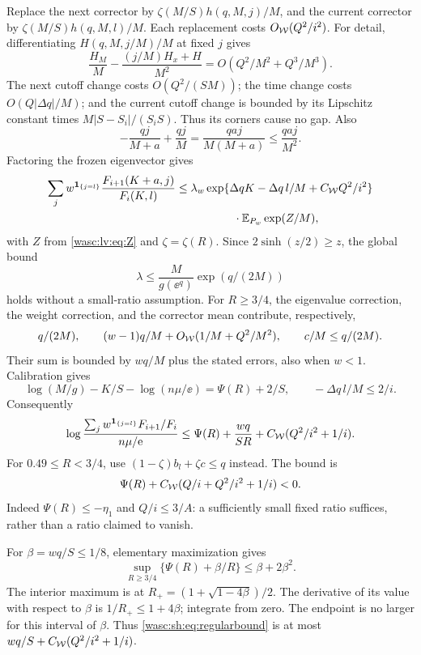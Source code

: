 \documentclass[11pt,a4paper]{article}
\theoremstyle{remark}\newtheorem{remark}[theorem]{Remark}
\newcommand{\ind}{\mathbf 1}\newcommand{\wasc}{\operatorname{wasc}}\newcommand{\dasc}{\operatorname{dasc}}
\numberwithin{equation}{section}
\begin{document}
Replace the next corrector by $\zeta(M/S)h(q,M,j)/M$, and the current corrector by $\zeta(M/S)h(q,M,l)/M$. Each replacement costs $O_{\mathcal W}(Q^2/i^2)$. For detail, differentiating $H(q,M,j/M)/M$ at fixed $j$ gives
\[
\frac{H_M}{M}-\frac{(j/M)H_x+H}{M^2}
=O(Q^2/M^2+Q^3/M^3).
\]
The next cutoff change costs $O(Q^2/(SM))$; the time change costs $O(Q|\Delta q|/M)$; and the current cutoff change is bounded by its Lipschitz constant times $M|S-S_i|/(S_iS)$. Thus its corners cause no gap. Also
\[
-\frac{qj}{M+a}+\frac{qj}{M}=\frac{qaj}{M(M+a)}\le\frac{qaj}{M^2}.
\]
Factoring the frozen eigenvector gives
\begin{align}\label{wasc:sh:eq:regulartransfer}
\sum_j w^{\ind_{\{j=l\}}}\frac{F_{i+1}(K+a,j)}{F_i(K,l)}
&\le\lambda_w\exp\{\Delta qK-\Delta q\,l/M+C_{\Wc}Q^2/i^2\}\notag\\
&\hspace{18mm}\cdot\E_{P_w}\exp(Z/M),
\end{align}
with $Z$ from \eqref{wasc:lv:eq:Z} and $\zeta=\zeta(R)$.
Since $2\sinh(z/2)\ge z$, the global bound
\begin{equation}\label{wasc:sh:eq:eigenupper}
\lambda\le\frac M{g(\ee^q)}\exp(q/(2M))
\end{equation}
holds without a small-ratio assumption. For $R\ge3/4$, the eigenvalue correction, the weight correction, and the corrector mean contribute, respectively,
\[
q/(2M),\qquad (w-1)q/M+O_{\mathcal W}(1/M+Q^2/M^2),\qquad c/M\le q/(2M).
\]
Their sum is bounded by $wq/M$ plus the stated errors, also when $w<1$. Calibration gives
\[
\log(M/g)-K/S-\log(n\mu/\ee)=\Psi(R)+2/S,
\qquad-\Delta q\,l/M\le2/i.
\]
Consequently
\begin{equation}\label{wasc:sh:eq:regularbound}
\log\frac{\sum_jw^{\ind_{\{j=l\}}}F_{i+1}/F_i}{n\mu/\ee}
\le\Psi(R)+\frac{wq}{SR}+C_{\Wc}(Q^2/i^2+1/i).
\end{equation}
For $0.49\le R<3/4$, use $(1-\zeta)b_l+\zeta c\le q$ instead. The bound is
\[
\Psi(R)+C_{\mathcal W}(Q/i+Q^2/i^2+1/i)<0.
\]
Indeed $\Psi(R)\le-\eta_1$ and $Q/i\le3/A$: a sufficiently small fixed ratio suffices, rather than a ratio claimed to vanish.

For $\beta=wq/S\le1/8$, elementary maximization gives
\begin{equation}\label{wasc:sh:eq:psimax}
\sup_{R\ge3/4}\{\Psi(R)+\beta/R\}\le\beta+2\beta^2.
\end{equation}
The interior maximum is at $R_+=(1+\sqrt{1-4\beta})/2$. The derivative of its value with respect to $\beta$ is $1/R_+\le1+4\beta$; integrate from zero. The endpoint is no larger for this interval of $\beta$. Thus \eqref{wasc:sh:eq:regularbound} is at most
$wq/S+C_{\mathcal W}(Q^2/i^2+1/i)$.
\end{document}

